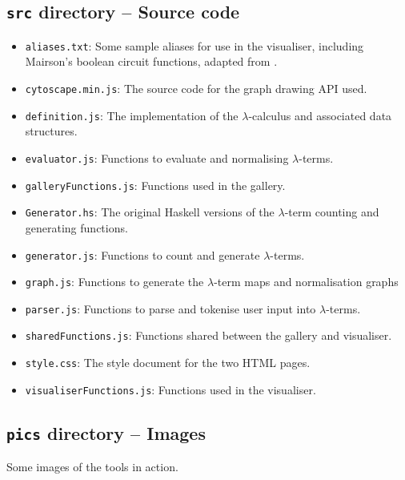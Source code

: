 \documentclass[11pt]{article}
\begin{document}
\subsection{\texttt{src} directory -- Source code}
\begin{itemize}
    \item \texttt{aliases.txt}: Some sample aliases for use in the visualiser, including Mairson's boolean circuit functions, adapted from \cite{mairson}.
    \item \texttt{cytoscape.min.js}: The source code for the graph drawing API used.
    \item \texttt{definition.js}: The implementation of the $\lambda$-calculus and associated data structures.
    \item \texttt{evaluator.js}: Functions to evaluate and normalising $\lambda$-terms.
    \item \texttt{galleryFunctions.js}: Functions used in the gallery.
    \item \texttt{Generator.hs}: The original Haskell versions of the $\lambda$-term counting and generating functions.
    \item \texttt{generator.js}: Functions to count and generate $\lambda$-terms.
    \item \texttt{graph.js}: Functions to generate the $\lambda$-term maps and normalisation graphs
    \item \texttt{parser.js}: Functions to parse and tokenise user input into $\lambda$-terms.
    \item \texttt{sharedFunctions.js}: Functions shared between the gallery and visualiser.
    \item \texttt{style.css}: The style document for the two HTML pages.
    \item \texttt{visualiserFunctions.js}: Functions used in the visualiser.
\end{itemize}

\subsection{\texttt{pics} directory -- Images}
Some images of the tools in action.
\end{document}
